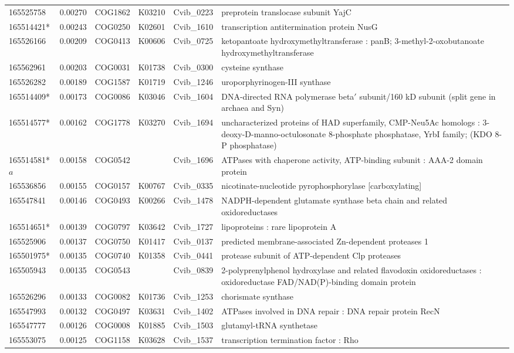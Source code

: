 \begin{landscape}
\begin{longtable}{p{1.8cm}p{0.9cm}p{2.2cm}p{1cm}p{2.8cm}p{13.4cm}}
165525758&0.00270&COG1862&K03210&Cvib\_0223&preprotein translocase subunit YajC \\
165514421*&0.00243&COG0250&K02601&Cvib\_1610&transcription antitermination protein NusG \\
165526166&0.00209&COG0413&K00606&Cvib\_0725&ketopantoate hydroxymethyltransferase : panB; 3-methyl-2-oxobutanoate hydroxymethyltransferase \\
165562961&0.00203&COG0031&K01738&Cvib\_0300&cysteine synthase \\
165526282&0.00189&COG1587&K01719&Cvib\_1246&uroporphyrinogen-III synthase \\
165514409*&0.00173&COG0086&K03046&Cvib\_1604&DNA-directed RNA polymerase beta$'$ subunit/160 kD subunit (split gene in archaea and Syn) \\
165514577*&0.00162&COG1778&K03270&Cvib\_1694&uncharacterized proteins of HAD superfamily, CMP-Neu5Ac homologs : 3-deoxy-D-manno-octulosonate 8-phosphate phosphatase, YrbI family; (KDO 8-P phosphatase) \\
165514581*$a$&0.00158&COG0542&&Cvib\_1696&ATPases with chaperone activity, ATP-binding subunit : AAA-2 domain protein \\
165536856&0.00155&COG0157&K00767&Cvib\_0335&nicotinate-nucleotide pyrophosphorylase [carboxylating] \\
165547841&0.00146&COG0493&K00266&Cvib\_1478&NADPH-dependent glutamate synthase beta chain and related oxidoreductases \\
165514651*&0.00139&COG0797&K03642&Cvib\_1727&lipoproteins : rare lipoprotein A \\
165525906&0.00137&COG0750&K01417&Cvib\_0137&predicted membrane-associated Zn-dependent proteases 1 \\
165501975*&0.00135&COG0740&K01358&Cvib\_0441&protease subunit of ATP-dependent Clp proteases \\
165505943&0.00135&COG0543&&Cvib\_0839&2-polyprenylphenol hydroxylase and related flavodoxin oxidoreductases : oxidoreductase FAD/NAD(P)-binding domain protein \\
165526296&0.00133&COG0082&K01736&Cvib\_1253&chorismate synthase \\
165547993&0.00132&COG0497&K03631&Cvib\_1402&ATPases involved in DNA repair : DNA repair protein RecN \\
165547777&0.00126&COG0008&K01885&Cvib\_1503&glutamyl-tRNA synthetase \\
165553075&0.00125&COG1158&K03628&Cvib\_1537&transcription termination factor : Rho \\

\end{longtable}
\end{landscape}
